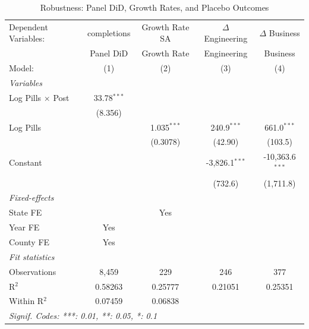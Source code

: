 
\begin{table}[htbp]
   \caption{\label{tab:robust} Robustness: Panel DiD, Growth Rates, and Placebo Outcomes}
   \centering
   \begin{tabular}{lcccc}
      \tabularnewline \midrule \midrule
      Dependent Variables:     & completions   & Growth Rate SA & $\Delta$ Engineering  & $\Delta$ Business\\   
                               & Panel DiD     & Growth Rate    & Engineering           & Business \\   
      Model:                   & (1)           & (2)            & (3)                   & (4)\\  
      \midrule
      \emph{Variables}\\
      Log Pills $\times$ Post  & 33.78$^{***}$ &                &                       &   \\   
                               & (8.356)       &                &                       &   \\   
      Log Pills                &               & 1.035$^{***}$  & 240.9$^{***}$         & 661.0$^{***}$\\   
                               &               & (0.3078)       & (42.90)               & (103.5)\\   
      Constant                 &               &                & -3,826.1$^{***}$      & -10,363.6$^{***}$\\   
                               &               &                & (732.6)               & (1,711.8)\\   
      \midrule
      \emph{Fixed-effects}\\
      State FE                 &               & Yes            &                       & \\  
      Year FE                  & Yes           &                &                       & \\  
      County FE                & Yes           &                &                       & \\  
      \midrule
      \emph{Fit statistics}\\
      Observations             & 8,459         & 229            & 246                   & 377\\  
      R$^2$                    & 0.58263       & 0.25777        & 0.21051               & 0.25351\\  
      Within R$^2$             & 0.07459       & 0.06838        &                       & \\  
      \midrule \midrule
      \multicolumn{5}{l}{\emph{Signif. Codes: ***: 0.01, **: 0.05, *: 0.1}}\\
   \end{tabular}
   

\end{table}
